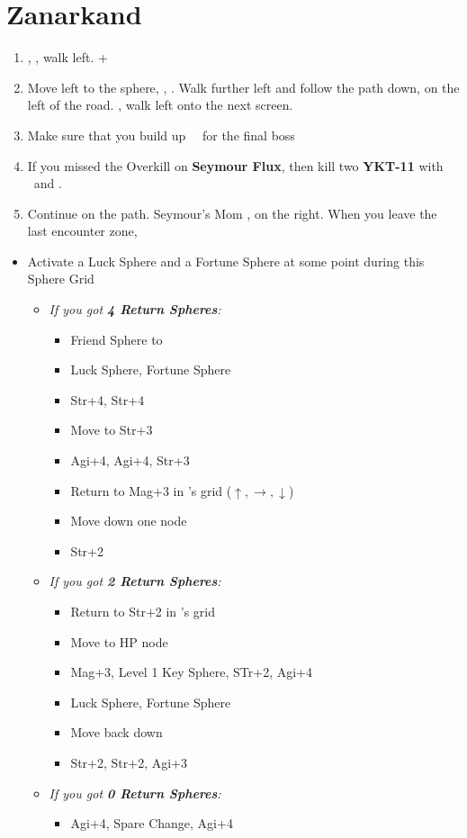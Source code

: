 \chapter{Zanarkand}
\begin{enumerate}
	\item \sd, \cs[0:50], walk left. \fmv+\cs[2:20]
	\item Move left to the sphere, \sd, \cs[1:40]. Walk further left and follow the path down,  on the left of the road. \cs[3:20], walk left onto the next screen.
	\item Make sure that you build up \rikku\ \od\ for the final boss
	\item If you missed the Overkill on \textbf{Seymour Flux}, then kill two \textbf{YKT-11} with \yuna\ and \tidus.
	\item Continue on the path. Seymour's Mom \cs,  on the right. When you leave the last encounter zone, 
\end{enumerate}
\begin{spheregrid}
\begin{itemize}
	\item Activate a Luck Sphere and a Fortune Sphere at some point during this Sphere Grid
	\yunaf
	\begin{itemize}
		\item \textit{If you got \textbf{4 Return Spheres}:}
		\begin{itemize}
			\item Friend Sphere to \lulu
			\item Luck Sphere, Fortune Sphere
			\item Str+4, Str+4
			\item Move to Str+3
			\item Agi+4, Agi+4, Str+3
			\item Return to Mag+3 in \wakka's grid ($\uparrow, \rightarrow, \downarrow$)
			\item Move down one node
			\item Str+2
		\end{itemize}
		\item \textit{If you got \textbf{2 Return Spheres}:}
		\begin{itemize}
			\item Return to Str+2 in \wakka's grid
			\item Move to HP node
			\item Mag+3, Level 1 Key Sphere, STr+2, Agi+4
			\item Luck Sphere, Fortune Sphere
			\item Move back down
			\item Str+2, Str+2, Agi+3
		\end{itemize}
		\item \textit{If you got \textbf{0 Return Spheres}:}
		\begin{itemize}
			\rikkuf Move to the MDef Node below Agi+4 below you
			\yunaf Friend Sphere to \rikku
			\item Agi+4, Spare Change, Agi+4 
		\end{itemize}
	\end{itemize}
\end{itemize}
\end{spheregrid}
